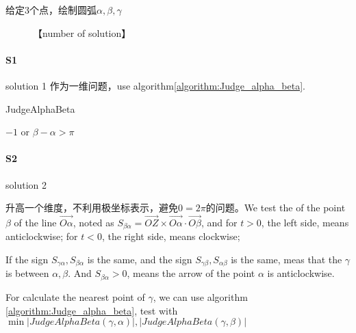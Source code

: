 \documentclass[UTF8]{../09-Mathematics}
\begin{document}
\begin{question}
  给定3个点，绘制圆弧$\alpha, \beta, \gamma$

  \begin{figure}[h]
    \centering
    \caption{【number of solution】}\label{fig:number_of_solution}
  \end{figure}
  
  \paragraph{S1} solution 1
  作为一维问题，use algorithm\ref{algorithm:Judge_alpha_beta}.

  \begin{algorithm}[ht]
    \caption{JudgeAlphaBeta}\label{algorithm:Judge_alpha_beta}
    \SetAlgoLined
    \KwIn{$\alpha, \beta$}
    \ElseIf{$\alpha > \beta$}
    {
      {
        \KwRet $-1$ or $\beta - \alpha > \pi$\;
      }
    }
    \;
  \end{algorithm}

  \paragraph{S2} solution 2

  升高一个维度，不利用极坐标表示，避免$0 = 2\pi$的问题。We test the of the point $\beta$ of the line $\vec{O\alpha}$, noted as $S_{\beta \alpha} = \vec {OZ} \times \vec{O\alpha} \cdot \vec{O\beta}$, and for $t>0$, the left side, means anticlockwise; for $t<0$, the right side, means clockwise;

  If the sign $S_{\gamma \alpha}, S_{\beta \alpha}$ is the same, and the sign $S_{\gamma \beta}, S_{\alpha \beta}$ is the same, meas that the $\gamma$ is between $\alpha, \beta$. And $S_{\beta \alpha}>0$, means the arrow of the point $\alpha$ is anticlockwise.

  For calculate the nearest point of $\gamma$, we can use algorithm \ref{algorithm:Judge_alpha_beta}, test with $\min{|JudgeAlphaBeta(\gamma, \alpha)|, |JudgeAlphaBeta(\gamma,\beta)|}$

  \end{question}
\end{document}
